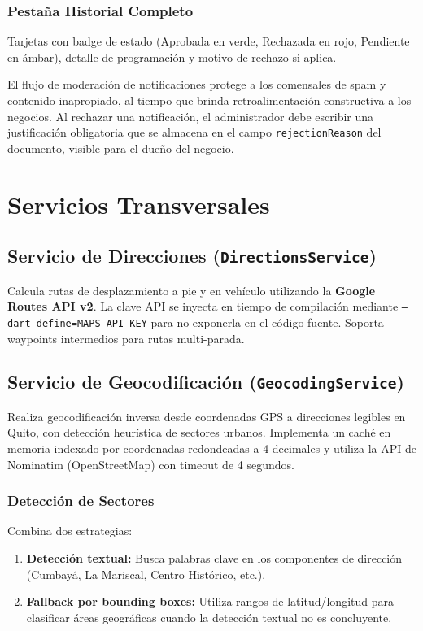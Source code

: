 \documentclass[11pt, a4paper, oneside]{report}
\begin{document}
\subsection{Pestaña Historial Completo}
Tarjetas con badge de estado (Aprobada en verde, Rechazada en rojo, Pendiente en ámbar), detalle de programación y motivo de rechazo si aplica.

\begin{techbox}
El flujo de moderación de notificaciones protege a los comensales de spam y contenido inapropiado, al tiempo que brinda retroalimentación constructiva a los negocios. Al rechazar una notificación, el administrador debe escribir una justificación obligatoria que se almacena en el campo \texttt{rejectionReason} del documento, visible para el dueño del negocio.
\end{techbox}

\chapter{Servicios Transversales}

\section{Servicio de Direcciones (\texttt{DirectionsService})}

Calcula rutas de desplazamiento a pie y en vehículo utilizando la \textbf{Google Routes API v2}. La clave API se inyecta en tiempo de compilación mediante \texttt{--dart-define=MAPS\_API\_KEY} para no exponerla en el código fuente. Soporta waypoints intermedios para rutas multi-parada.

\section{Servicio de Geocodificación (\texttt{GeocodingService})}

Realiza geocodificación inversa desde coordenadas GPS a direcciones legibles en Quito, con detección heurística de sectores urbanos. Implementa un caché en memoria indexado por coordenadas redondeadas a 4 decimales y utiliza la API de Nominatim (OpenStreetMap) con timeout de 4 segundos.

\subsection{Detección de Sectores}
Combina dos estrategias:
\begin{enumerate}
  \item \textbf{Detección textual:} Busca palabras clave en los componentes de dirección (Cumbayá, La Mariscal, Centro Histórico, etc.).
  \item \textbf{Fallback por bounding boxes:} Utiliza rangos de latitud/longitud para clasificar áreas geográficas cuando la detección textual no es concluyente.
\end{enumerate}
\end{document}
